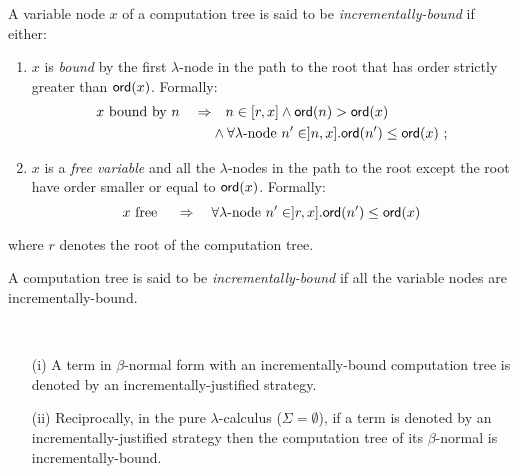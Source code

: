 \documentclass{llncs}
\newcommand\ord[1]{{\sf ord}(#1)}
\newcommand\imp{\Rightarrow}
\begin{document}
\begin{definition}
A variable node $x$ of a computation tree is said to be
\emph{incrementally-bound} if either:
\begin{enumerate}
\item $x$ is \emph{bound} by the first $\lambda$-node in the path to the root that has
order strictly greater than $\ord{x}$. Formally:
\begin{align*}
 x \mbox{ bound by } n \quad \imp & \quad n \in [r,x] \wedge \ord{n} > \ord{x} \\
                                  & \wedge \forall \lambda\mbox{-node } n' \in ]n,x] . \ord{n'} \leq \ord{x} \ ;
\end{align*}

\item $x$ is a \emph{free variable} and all the $\lambda$-nodes in the path to the root except the root have order
smaller or equal to $\ord{x}$. Formally:
$$ x \mbox{ free } \quad \imp \quad  \forall \lambda\mbox{-node } n' \in ]r,x] . \ord{n'} \leq \ord{x}$$
\end{enumerate}
where $r$ denotes the root of the computation tree.

A computation tree is said to be \emph{incrementally-bound} if all
the variable nodes are incrementally-bound.
\end{definition}

\begin{proposition} \
\label{prop:incrbound_imp_incrjustified}
\begin{enumerate}
\item[(i)] A term in $\beta$-normal form with an incrementally-bound computation tree is denoted by an incrementally-justified strategy.
\item[(ii)] Reciprocally, in the pure $\lambda$-calculus ($\Sigma=\emptyset$), if a term is denoted by an incrementally-justified strategy then the computation tree of its $\beta$-normal is incrementally-bound.
\end{enumerate}
\end{proposition}
\end{document}
